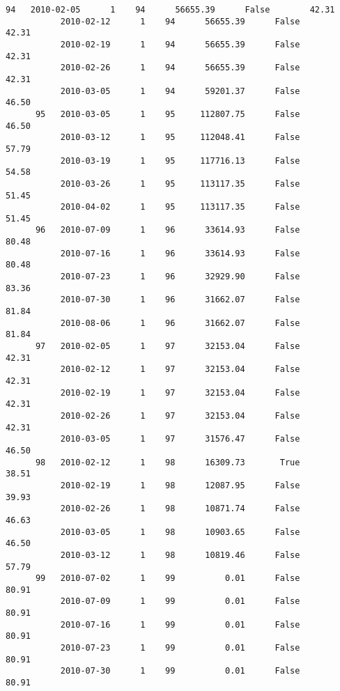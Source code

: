 \documentclass[11pt]{article}
\begin{document}
\begin{Verbatim}[commandchars=\\\{\}]
      94   2010-02-05      1    94      56655.39      False        42.31   
           2010-02-12      1    94      56655.39      False        42.31   
           2010-02-19      1    94      56655.39      False        42.31   
           2010-02-26      1    94      56655.39      False        42.31   
           2010-03-05      1    94      59201.37      False        46.50   
      95   2010-03-05      1    95     112807.75      False        46.50   
           2010-03-12      1    95     112048.41      False        57.79   
           2010-03-19      1    95     117716.13      False        54.58   
           2010-03-26      1    95     113117.35      False        51.45   
           2010-04-02      1    95     113117.35      False        51.45   
      96   2010-07-09      1    96      33614.93      False        80.48   
           2010-07-16      1    96      33614.93      False        80.48   
           2010-07-23      1    96      32929.90      False        83.36   
           2010-07-30      1    96      31662.07      False        81.84   
           2010-08-06      1    96      31662.07      False        81.84   
      97   2010-02-05      1    97      32153.04      False        42.31   
           2010-02-12      1    97      32153.04      False        42.31   
           2010-02-19      1    97      32153.04      False        42.31   
           2010-02-26      1    97      32153.04      False        42.31   
           2010-03-05      1    97      31576.47      False        46.50   
      98   2010-02-12      1    98      16309.73       True        38.51   
           2010-02-19      1    98      12087.95      False        39.93   
           2010-02-26      1    98      10871.74      False        46.63   
           2010-03-05      1    98      10903.65      False        46.50   
           2010-03-12      1    98      10819.46      False        57.79   
      99   2010-07-02      1    99          0.01      False        80.91   
           2010-07-09      1    99          0.01      False        80.91   
           2010-07-16      1    99          0.01      False        80.91   
           2010-07-23      1    99          0.01      False        80.91   
           2010-07-30      1    99          0.01      False        80.91   


\end{Verbatim}
\end{document}

